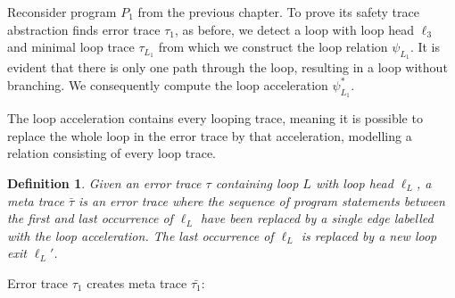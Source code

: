 \documentclass{article}
\newtheorem{mydef}{Definition}
\begin{document}
Reconsider program $P_1$ from the previous chapter. To prove its safety trace abstraction finds error trace $\tau_1$, as before, we detect a loop with loop head $\ell_3$ and minimal loop trace $\tau_{L_1}$ from which we construct the loop relation $\psi_{L_1}$. It is evident that there is only one path through the loop, resulting in a loop without branching. We consequently compute the loop acceleration $\psi^*_{L_1}$. \par

The loop acceleration contains every looping trace, meaning it is possible to replace the whole loop in the error trace by that acceleration, modelling a relation consisting of every loop trace.

\begin{mydef}
	Given an error trace $\tau$ containing loop $L$ with loop head $\ell_L$, a meta trace $\bar{\tau}$ is an error trace where the sequence of program statements between the first and last occurrence of $\ell_L$ have been replaced by a single edge labelled with the loop acceleration. The last occurrence of $\ell_L$ is replaced by a new loop exit $\ell_L'$.
\end{mydef}

Error trace $\tau_1$ creates meta trace $\bar{\tau_1}$:


\begin{figure}[H]
\end{figure}
\end{document}
